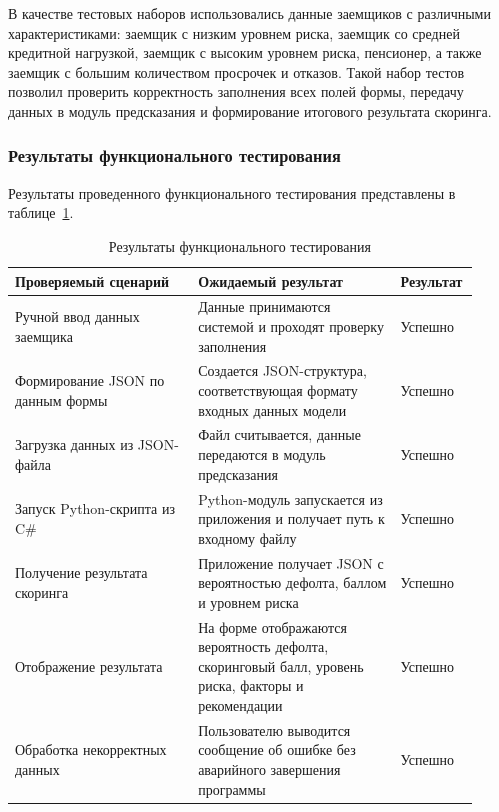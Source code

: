 В качестве тестовых наборов использовались данные заемщиков с различными характеристиками: заемщик с низким уровнем риска, заемщик со средней кредитной нагрузкой, заемщик с высоким уровнем риска, пенсионер, а также заемщик с большим количеством просрочек и отказов. Такой набор тестов позволил проверить корректность заполнения всех полей формы, передачу данных в модуль предсказания и формирование итогового результата скоринга.

\FloatBarrier

\subsubsection{Результаты функционального тестирования}

Результаты проведенного функционального тестирования представлены в таблице~\ref{tab:functional_testing_results}.

\begin{table}[ht!]
  \centering
  \caption{Результаты функционального тестирования}
  \label{tab:functional_testing_results}
  \begin{tabular}{|p{0.38\linewidth}|p{0.42\linewidth}|p{0.12\linewidth}|}
    \hline
    Проверяемый сценарий              & Ожидаемый результат                                                                                & Результат \\
    \hline
    Ручной ввод данных заемщика       & Данные принимаются системой и проходят проверку заполнения                                         & Успешно   \\
    \hline
    Формирование JSON по данным формы & Создается JSON-структура, соответствующая формату входных данных модели                            & Успешно   \\
    \hline
    Загрузка данных из JSON-файла     & Файл считывается, данные передаются в модуль предсказания                                          & Успешно   \\
    \hline
    Запуск Python-скрипта из C\#      & Python-модуль запускается из приложения и получает путь к входному файлу                           & Успешно   \\
    \hline
    Получение результата скоринга     & Приложение получает JSON с вероятностью дефолта, баллом и уровнем риска                            & Успешно   \\
    \hline
    Отображение результата            & На форме отображаются вероятность дефолта, скоринговый балл, уровень риска, факторы и рекомендации & Успешно   \\
    \hline
    Обработка некорректных данных     & Пользователю выводится сообщение об ошибке без аварийного завершения программы                     & Успешно   \\
    \hline
  \end{tabular}
\end{table}


